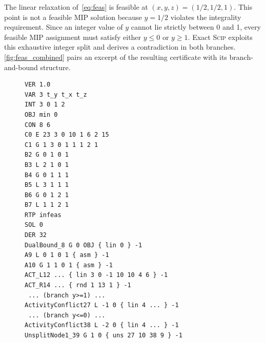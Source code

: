 \documentclass{article}
\newcommand{\scip}{\textsc{Scip}}
\begin{document}
The linear relaxation of~\autoref{eq:feas} is feasible at $(x,y,z)=(1/2,1/2,1)$.
This point is not a feasible MIP solution because $y=1/2$ violates the integrality requirement.
Since an integer value of $y$ cannot lie strictly between 0 and 1, every feasible MIP assignment must satisfy either $y\le0$ or $y\ge1$.
Exact \scip{} exploits this exhaustive integer split and derives a contradiction in both branches.
\autoref{fig:feas_combined} pairs an excerpt of the resulting certificate with its branch-and-bound structure.

\begin{figure}[t]
\centering
\begin{minipage}[t]{0.5\textwidth}
\begin{lstlisting}[basicstyle=\ttfamily\tiny]
VER 1.0
VAR 3 t_y t_x t_z
INT 3 0 1 2
OBJ min 0
CON 8 6
C0 E 23 3 0 10 1 6 2 15
C1 G 1 3 0 1 1 1 2 1
B2 G 0 1 0 1
B3 L 2 1 0 1
B4 G 0 1 1 1
B5 L 3 1 1 1
B6 G 0 1 2 1
B7 L 1 1 2 1
RTP infeas
SOL 0
DER 32
DualBound_8 G 0 OBJ { lin 0 } -1
A9 L 0 1 0 1 { asm } -1
A10 G 1 1 0 1 { asm } -1
ACT_L12 ... { lin 3 0 -1 10 10 4 6 } -1
ACT_R14 ... { rnd 1 13 1 } -1
 ... (branch y>=1) ...
ActivityConflict27 L -1 0 { lin 4 ... } -1
 ... (branch y<=0) ...
ActivityConflict38 L -2 0 { lin 4 ... } -1
UnsplitNode1_39 G 1 0 { uns 27 10 38 9 } -1
\end{lstlisting}
\end{minipage}\hfill
\begin{minipage}[t]{0.48\textwidth}
\vspace{0pt} %
\end{minipage}
\end{figure}
\end{document}
